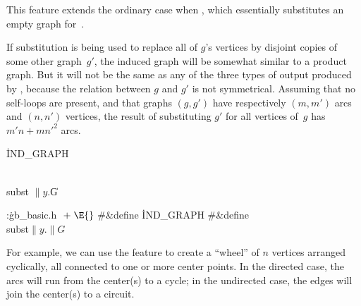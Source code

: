This feature extends the ordinary case when , which
essentially
substitutes an empty graph for~.

If substitution is being used to replace all of $g$'s vertices
by disjoint copies of some other graph~$g'$,
the induced graph will be somewhat similar to
a product graph. But it will not be the same as any of the three
types of output produced by , because the relation between
$g$ and $g'$ is not symmetrical. Assuming that no self-loops are
present, and that graphs $(g,g')$ have respectively $(m,m')$ arcs and
$(n,n')$ vertices, the result of substituting $g'$ for all
vertices of~$g$ has $m'n+mn'^2$ arcs.


\Y\B\4\D\.{IND\_GRAPH}\5
\par
\B\4\D\\{subst}\5
$\|y.{}$\|G\par
\Y\B\4:\.{gb\_basic.h }\X${}\mathrel+\E{}$\6
\8\#\&{define} \.{IND\_GRAPH}\5\6
\8\#\&{define} \\{subst}\5${}\|y.\|G{}$\par
\fi

For example, we can use the  feature to create a
``wheel'' of $n$ vertices arranged cyclically, all connected to one or
more center points. In the directed case, the arcs will run from the
center(s) to a cycle; in the undirected case, the edges will join the
center(s) to a circuit.

